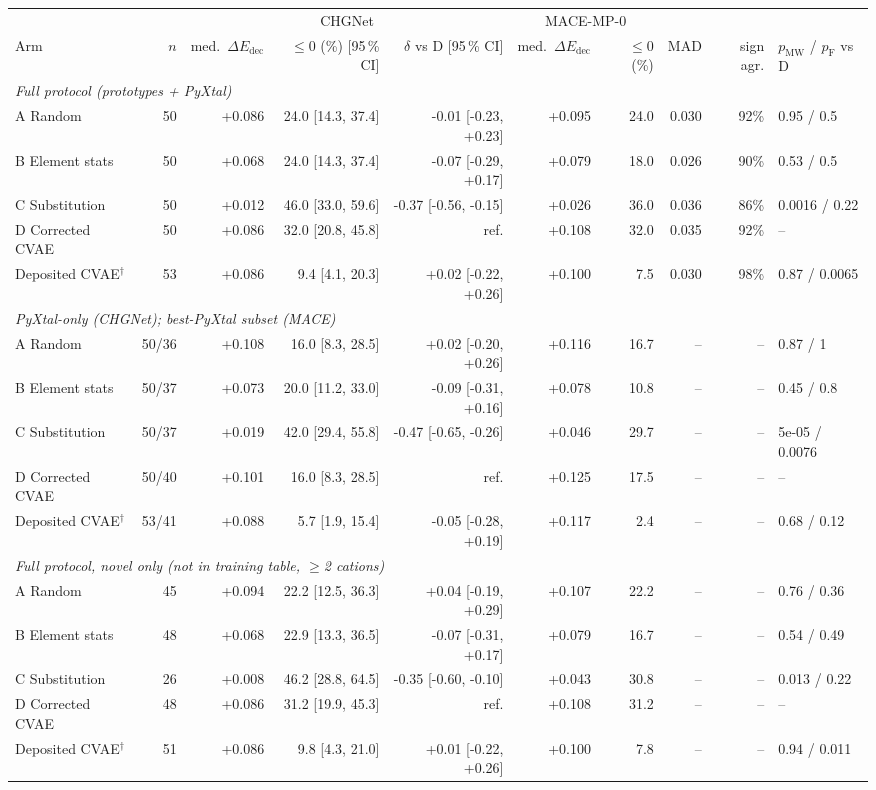 \begin{tabular}{lrrrrrrrrl}
\toprule
 & & \multicolumn{3}{c}{CHGNet} & \multicolumn{2}{c}{MACE-MP-0} & & & \\
\cmidrule(lr){3-5}\cmidrule(lr){6-7}
Arm & $n$ & med.\ $\Delta E_\mathrm{dec}$ & $\le 0$ (\%) [95\,\% CI] & $\delta$ vs D [95\,\% CI] & med.\ $\Delta E_\mathrm{dec}$ & $\le 0$ (\%) & MAD & sign agr. & $p_\mathrm{MW}$ / $p_\mathrm{F}$ vs D \\
\midrule
\multicolumn{10}{l}{\emph{Full protocol (prototypes + PyXtal)}} \\
A Random & 50 & +0.086 & 24.0 [14.3, 37.4] & -0.01 [-0.23, +0.23] & +0.095 & 24.0 & 0.030 & 92\% & 0.95 / 0.5 \\
B Element stats & 50 & +0.068 & 24.0 [14.3, 37.4] & -0.07 [-0.29, +0.17] & +0.079 & 18.0 & 0.026 & 90\% & 0.53 / 0.5 \\
C Substitution & 50 & +0.012 & 46.0 [33.0, 59.6] & -0.37 [-0.56, -0.15] & +0.026 & 36.0 & 0.036 & 86\% & 0.0016 / 0.22 \\
D Corrected CVAE & 50 & +0.086 & 32.0 [20.8, 45.8] & ref. & +0.108 & 32.0 & 0.035 & 92\% & -- \\
Deposited CVAE$^\dagger$ & 53 & +0.086 & 9.4 [4.1, 20.3] & +0.02 [-0.22, +0.26] & +0.100 & 7.5 & 0.030 & 98\% & 0.87 / 0.0065 \\
\midrule
\multicolumn{10}{l}{\emph{PyXtal-only (CHGNet); best-PyXtal subset (MACE)}} \\
A Random & 50/36 & +0.108 & 16.0 [8.3, 28.5] & +0.02 [-0.20, +0.26] & +0.116 & 16.7 & -- & -- & 0.87 / 1 \\
B Element stats & 50/37 & +0.073 & 20.0 [11.2, 33.0] & -0.09 [-0.31, +0.16] & +0.078 & 10.8 & -- & -- & 0.45 / 0.8 \\
C Substitution & 50/37 & +0.019 & 42.0 [29.4, 55.8] & -0.47 [-0.65, -0.26] & +0.046 & 29.7 & -- & -- & 5e-05 / 0.0076 \\
D Corrected CVAE & 50/40 & +0.101 & 16.0 [8.3, 28.5] & ref. & +0.125 & 17.5 & -- & -- & -- \\
Deposited CVAE$^\dagger$ & 53/41 & +0.088 & 5.7 [1.9, 15.4] & -0.05 [-0.28, +0.19] & +0.117 & 2.4 & -- & -- & 0.68 / 0.12 \\
\midrule
\multicolumn{10}{l}{\emph{Full protocol, novel only (not in training table, $\geq$2 cations)}} \\
A Random & 45 & +0.094 & 22.2 [12.5, 36.3] & +0.04 [-0.19, +0.29] & +0.107 & 22.2 & -- & -- & 0.76 / 0.36 \\
B Element stats & 48 & +0.068 & 22.9 [13.3, 36.5] & -0.07 [-0.31, +0.17] & +0.079 & 16.7 & -- & -- & 0.54 / 0.49 \\
C Substitution & 26 & +0.008 & 46.2 [28.8, 64.5] & -0.35 [-0.60, -0.10] & +0.043 & 30.8 & -- & -- & 0.013 / 0.22 \\
D Corrected CVAE & 48 & +0.086 & 31.2 [19.9, 45.3] & ref. & +0.108 & 31.2 & -- & -- & -- \\
Deposited CVAE$^\dagger$ & 51 & +0.086 & 9.8 [4.3, 21.0] & +0.01 [-0.22, +0.26] & +0.100 & 7.8 & -- & -- & 0.94 / 0.011 \\
\bottomrule
\end{tabular}
